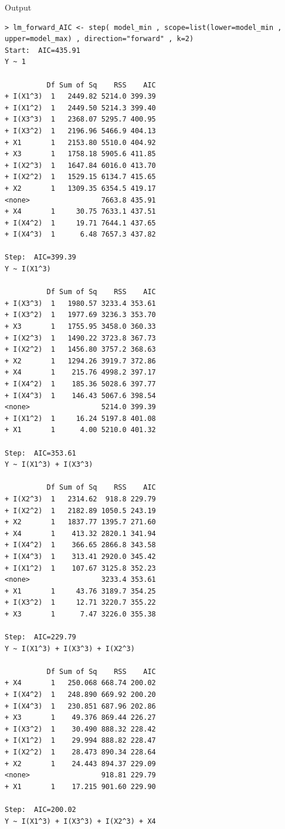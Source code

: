 Output
\begin{lstlisting}[style=output]
> lm_forward_AIC <- step( model_min , scope=list(lower=model_min , upper=model_max) , direction="forward" , k=2)
Start:  AIC=435.91
Y ~ 1

          Df Sum of Sq    RSS    AIC
+ I(X1^3)  1   2449.82 5214.0 399.39
+ I(X1^2)  1   2449.50 5214.3 399.40
+ I(X3^3)  1   2368.07 5295.7 400.95
+ I(X3^2)  1   2196.96 5466.9 404.13
+ X1       1   2153.80 5510.0 404.92
+ X3       1   1758.18 5905.6 411.85
+ I(X2^3)  1   1647.84 6016.0 413.70
+ I(X2^2)  1   1529.15 6134.7 415.65
+ X2       1   1309.35 6354.5 419.17
<none>                 7663.8 435.91
+ X4       1     30.75 7633.1 437.51
+ I(X4^2)  1     19.71 7644.1 437.65
+ I(X4^3)  1      6.48 7657.3 437.82

Step:  AIC=399.39
Y ~ I(X1^3)

          Df Sum of Sq    RSS    AIC
+ I(X3^3)  1   1980.57 3233.4 353.61
+ I(X3^2)  1   1977.69 3236.3 353.70
+ X3       1   1755.95 3458.0 360.33
+ I(X2^3)  1   1490.22 3723.8 367.73
+ I(X2^2)  1   1456.80 3757.2 368.63
+ X2       1   1294.26 3919.7 372.86
+ X4       1    215.76 4998.2 397.17
+ I(X4^2)  1    185.36 5028.6 397.77
+ I(X4^3)  1    146.43 5067.6 398.54
<none>                 5214.0 399.39
+ I(X1^2)  1     16.24 5197.8 401.08
+ X1       1      4.00 5210.0 401.32

Step:  AIC=353.61
Y ~ I(X1^3) + I(X3^3)

          Df Sum of Sq    RSS    AIC
+ I(X2^3)  1   2314.62  918.8 229.79
+ I(X2^2)  1   2182.89 1050.5 243.19
+ X2       1   1837.77 1395.7 271.60
+ X4       1    413.32 2820.1 341.94
+ I(X4^2)  1    366.65 2866.8 343.58
+ I(X4^3)  1    313.41 2920.0 345.42
+ I(X1^2)  1    107.67 3125.8 352.23
<none>                 3233.4 353.61
+ X1       1     43.76 3189.7 354.25
+ I(X3^2)  1     12.71 3220.7 355.22
+ X3       1      7.47 3226.0 355.38

Step:  AIC=229.79
Y ~ I(X1^3) + I(X3^3) + I(X2^3)

          Df Sum of Sq    RSS    AIC
+ X4       1   250.068 668.74 200.02
+ I(X4^2)  1   248.890 669.92 200.20
+ I(X4^3)  1   230.851 687.96 202.86
+ X3       1    49.376 869.44 226.27
+ I(X3^2)  1    30.490 888.32 228.42
+ I(X1^2)  1    29.994 888.82 228.47
+ I(X2^2)  1    28.473 890.34 228.64
+ X2       1    24.443 894.37 229.09
<none>                 918.81 229.79
+ X1       1    17.215 901.60 229.90

Step:  AIC=200.02
Y ~ I(X1^3) + I(X3^3) + I(X2^3) + X4


\end{lstlisting}

